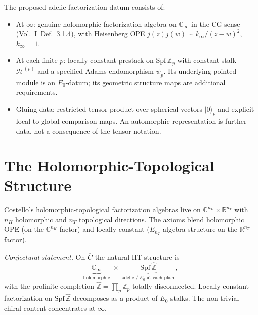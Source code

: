 \begin{definition}
\label{v4-arith:def:minimal-adelic-factorization}
The proposed adelic factorization datum consists of:
\begin{itemize}
\item At \(\infty\): genuine holomorphic factorization algebra on
\(\mathbb{C}_{\infty}\) in the CG sense (Vol.~I~Def.~3.1.4), with
Heisenberg OPE \(j(z)j(w)\sim k_{\infty}/(z-w)^{2}\), \(k_{\infty}=1\).
\item At each finite \(p\): locally constant prestack on
\(\mathrm{Spf}\,\mathbb{Z}_{p}\) with constant stalk \(\mathcal{H}^{(p)}\)
and a specified Adams endomorphism \(\psi_p\). Its underlying
pointed module is an \(E_0\)-datum; its geometric structure maps are
additional requirements.
\item Gluing data: restricted tensor product over spherical vectors
\(|0\rangle_{p}\) and explicit local-to-global comparison maps. An automorphic
representation is further data, not a consequence of the tensor notation.
\end{itemize}
\end{definition}

\section{The Holomorphic-Topological Structure}
\label{v4-arith:cg:HT-structure}

\begin{remark}
Costello's holomorphic-topological factorization algebras live on
\(\mathbb{C}^{n_{H}}\times\mathbb{R}^{n_{T}}\) with \(n_{H}\) holomorphic
and \(n_{T}\) topological directions. The axioms blend holomorphic
OPE (on the \(\mathbb{C}^{n_{H}}\) factor) and locally constant
(\(E_{n_{T}}\)-algebra structure on the \(\mathbb{R}^{n_{T}}\) factor).
\end{remark}

\begin{conjecture}
\label{v4-arith:thm:adelic-HT}
\emph{Conjectural statement.} On \(\overline{C}\) the natural HT
structure is
\begin{equation*}
\underbrace{\mathbb{C}_{\infty}}_{\text{holomorphic}}
\;\times\;\underbrace{\mathrm{Spf}\,\widehat{\mathbb{Z}}}_{\text{adelic / }E_{0}\text{ at each place}},
\end{equation*}
with the profinite completion \(\widehat{\mathbb{Z}}=\prod_{p}\mathbb{Z}_{p}\)
totally disconnected. Locally constant factorization on
\(\mathrm{Spf}\,\widehat{\mathbb{Z}}\) decomposes as a product of
\(E_{0}\)-stalks. The non-trivial chiral content concentrates at
\(\infty\).
\end{conjecture}

